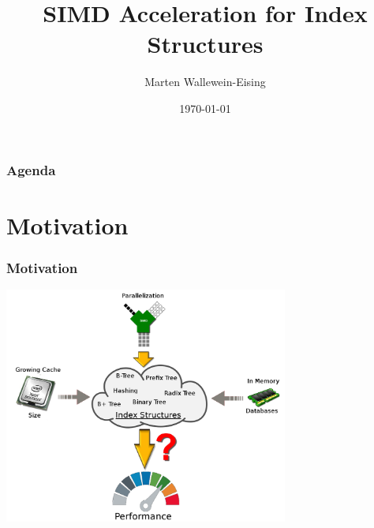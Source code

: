 \documentclass{beamer}
\title{SIMD Acceleration for Index Structures}
\author{Marten Wallewein-Eising}
\date{\today}
\institute{Otto von Guericke Univerity, Magdeburg}
\begin{document}
\begin{frame}[plain]
 \titlepage
\end{frame}



\section[Agenda]{}
\begin{frame}
\frametitle{Agenda}
\tableofcontents
\end{frame}

\section{Motivation}
\begin{frame}
\frametitle{Motivation}
	\begin{center}
		\includegraphics[width=0.7\textwidth]{img/big_picture.png}
	\end{center}
\end{frame}
\end{document}
